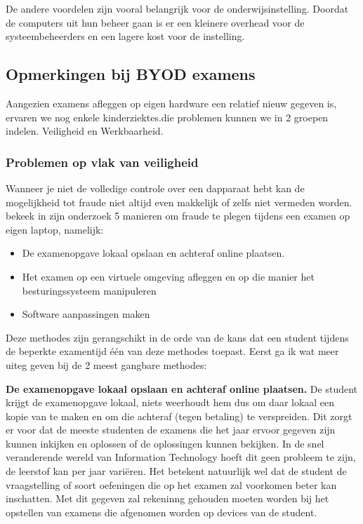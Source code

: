 De andere voordelen zijn vooral belangrijk voor de onderwijsinstelling. Doordat de computers uit hun beheer gaan is er een kleinere overhead voor de systeembeheerders en een lagere kost voor de instelling.

\subsection{Opmerkingen bij BYOD examens}

Aangezien examens afleggen op eigen hardware een relatief nieuw gegeven is, ervaren we nog enkele kinderziektes.die problemen kunnen we in 2 groepen indelen. Veiligheid en Werkbaarheid.\\ 

\subsubsection{Problemen op vlak van veiligheid}
Wanneer je niet de volledige controle over een dapparaat hebt kan de mogelijkheid tot fraude niet altijd even makkelijk of zelfs niet vermeden worden.
\textcite{Dawson2016} bekeek in zijn onderzoek 5 manieren om fraude te plegen tijdens een examen op eigen laptop, namelijk: 
\begin{itemize}
	\item De examenopgave lokaal opslaan en achteraf online plaatsen.
	\item Het examen op een virtuele omgeving afleggen en op die manier het besturingssysteem manipuleren
	\item Software aanpassingen maken 

\end{itemize}

Deze methodes zijn gerangschikt in de orde van de kans dat een student tijdens de beperkte examentijd \'{e}\'{e}n van deze methodes toepast. Eerst ga ik wat meer uiteg geven bij de 2 meest gangbare methodes: 

\textbf{De examenopgave lokaal opslaan en achteraf online plaatsen.} De student krijgt de examenopgave lokaal, niets weerhoudt hem dus om daar lokaal een kopie van te maken en om die achteraf (tegen betaling) te verspreiden. Dit zorgt er voor dat de meeste studenten de examens die het jaar ervoor gegeven zijn kunnen inkijken en oplossen of de oplossingen kunnen bekijken. In de snel veranderende wereld van Information Technology hoeft dit geen probleem te zijn, de leerstof kan per jaar vari\"{e}ren. Het betekent natuurlijk wel dat de student de vraagstelling of soort oefeningen die op het examen zal voorkomen beter kan inschatten. Met dit gegeven zal rekeninng gehouden moeten worden bij het opstellen van examens die afgenomen worden op devices van de student. 

